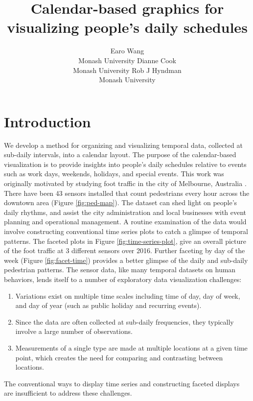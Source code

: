 \documentclass[article]{jss}
\author{
Earo Wang\\Monash University \And Dianne Cook\\Monash University \And Rob J Hyndman\\Monash University
}
\title{Calendar-based graphics for visualizing people's daily schedules}
\providecommand{\tightlist}{%
  \setlength{\itemsep}{0pt}\setlength{\parskip}{0pt}}
\theoremstyle{definition}
\theoremstyle{definition}
\theoremstyle{remark}
\begin{document}
\section{Introduction}\label{introduction}

We develop a method for organizing and visualizing temporal data,
collected at sub-daily intervals, into a calendar layout. The purpose of
the calendar-based visualization is to provide insights into people's
daily schedules relative to events such as work days, weekends,
holidays, and special events. This work was originally motivated by
studying foot traffic in the city of Melbourne, Australia \citep{ped}.
There have been 43 sensors installed that count pedestrians every hour
across the downtown area (Figure \ref{fig:ped-map}). The dataset can
shed light on people's daily rhythms, and assist the city administration
and local businesses with event planning and operational management. A
routine examination of the data would involve constructing conventional
time series plots to catch a glimpse of temporal patterns. The faceted
plots in Figure \ref{fig:time-series-plot}, give an overall picture of
the foot traffic at 3 different sensors over 2016. Further faceting by
day of the week (Figure \ref{fig:facet-time}) provides a better glimpse
of the daily and sub-daily pedestrian patterns. The sensor data, like
many temporal datasets on human behaviors, lends itself to a number of
exploratory data visualization challenges:

\begin{enumerate}
\def\labelenumi{\arabic{enumi}.}
\tightlist
\item
  Variations exist on multiple time scales including time of day, day of
  week, and day of year (such as public holiday and recurring events).
\item
  Since the data are often collected at sub-daily frequencies, they
  typically involve a large number of observations.
\item
  Measurements of a single type are made at multiple locations at a
  given time point, which creates the need for comparing and contrasting
  between locations.
\end{enumerate}

The conventional ways to display time series and constructing faceted
displays are insufficient to address these challenges.
\end{document}

